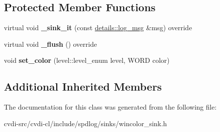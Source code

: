 \subsection*{Protected Member Functions}
\begin{DoxyCompactItemize}
\item 
virtual void {\bfseries \+\_\+sink\+\_\+it} (const \hyperlink{structspdlog_1_1details_1_1log__msg}{details\+::log\+\_\+msg} \&msg) override\hypertarget{classspdlog_1_1sinks_1_1wincolor__sink_a78b81c058c3cef01fc167255a39e4e09}{}\label{classspdlog_1_1sinks_1_1wincolor__sink_a78b81c058c3cef01fc167255a39e4e09}

\item 
virtual void {\bfseries \+\_\+flush} () override\hypertarget{classspdlog_1_1sinks_1_1wincolor__sink_aa81c6992763b1f82f75583994f96c404}{}\label{classspdlog_1_1sinks_1_1wincolor__sink_aa81c6992763b1f82f75583994f96c404}

\item 
void {\bfseries set\+\_\+color} (level\+::level\+\_\+enum level, W\+O\+RD color)\hypertarget{classspdlog_1_1sinks_1_1wincolor__sink_a7399ffc72b8b1956ce5b01098d6c69bc}{}\label{classspdlog_1_1sinks_1_1wincolor__sink_a7399ffc72b8b1956ce5b01098d6c69bc}

\end{DoxyCompactItemize}
\subsection*{Additional Inherited Members}


The documentation for this class was generated from the following file\+:\begin{DoxyCompactItemize}
\item 
cvdi-\/src/cvdi-\/cl/include/spdlog/sinks/wincolor\+\_\+sink.\+h\end{DoxyCompactItemize}
